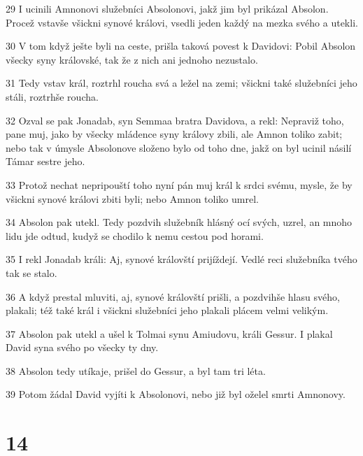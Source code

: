 \par 29 I ucinili Amnonovi služebníci Absolonovi, jakž jim byl prikázal Absolon. Procež vstavše všickni synové královi, vsedli jeden každý na mezka svého a utekli.
\par 30 V tom když ješte byli na ceste, prišla taková povest k Davidovi: Pobil Absolon všecky syny královské, tak že z nich ani jednoho nezustalo.
\par 31 Tedy vstav král, roztrhl roucha svá a ležel na zemi; všickni také služebníci jeho stáli, roztrhše roucha.
\par 32 Ozval se pak Jonadab, syn Semmaa bratra Davidova, a rekl: Nepraviž toho, pane muj, jako by všecky mládence syny královy zbili, ale Amnon toliko zabit; nebo tak v úmysle Absolonove složeno bylo od toho dne, jakž on byl ucinil násilí Támar sestre jeho.
\par 33 Protož nechat nepripouští toho nyní pán muj král k srdci svému, mysle, že by všickni synové královi zbiti byli; nebo Amnon toliko umrel.
\par 34 Absolon pak utekl. Tedy pozdvih služebník hlásný ocí svých, uzrel, an mnoho lidu jde odtud, kudyž se chodilo k nemu cestou pod horami.
\par 35 I rekl Jonadab králi: Aj, synové královští prijíždejí. Vedlé reci služebníka tvého tak se stalo.
\par 36 A když prestal mluviti, aj, synové královští prišli, a pozdvihše hlasu svého, plakali; též také král i všickni služebníci jeho plakali plácem velmi velikým.
\par 37 Absolon pak utekl a ušel k Tolmai synu Amiudovu, králi Gessur. I plakal David syna svého po všecky ty dny.
\par 38 Absolon tedy utíkaje, prišel do Gessur, a byl tam tri léta.
\par 39 Potom žádal David vyjíti k Absolonovi, nebo již byl oželel smrti Amnonovy.

\chapter{14}

